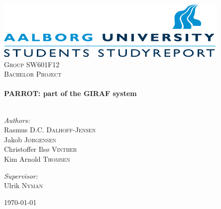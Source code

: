 \begin{nopagebreak}

\begin{center}

\includegraphics[width=\textwidth]{input/Images/aau_logo_en.pdf}\\[1cm]    

\textsc{\LARGE Group SW601F12}\\[1.5cm]

\textsc{\Large Bachelor Project}\\[0.5cm]


\HRule \\[0.4cm]
{ \huge \bfseries PARROT: part of the GIRAF system}\\[0.4cm]

\HRule \\[1.5cm]

\begin{minipage}{0.4\textwidth}
\begin{flushleft} \large
\vspace{1.25cm}
\emph{Authors:}\\
Rasmus D.C. \textsc{Dalhoff-Jensen} \\
Jakob \textsc{J\o{}rgensen} \\
Christoffer Ils\o{} \textsc{Vinther} \\
Kim Arnold \textsc{Thomsen}
\end{flushleft}
\end{minipage}
\begin{minipage}{0.4\textwidth}
\begin{flushright} \large
\emph{Supervisor:} \\
Ulrik \textsc{Nyman}
\end{flushright}
\end{minipage}

\vfill

{\large \today}

\end{center}

\end{nopagebreak}
